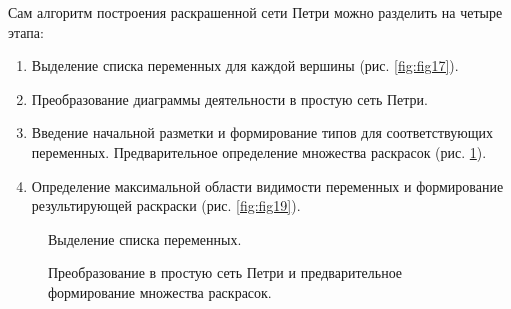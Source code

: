 Сам алгоритм построения раскрашенной сети Петри можно разделить на четыре этапа:
\begin{enumerate}
\item[1.] Выделение списка переменных для каждой вершины (рис. \ref{fig:fig17}).
\item[2.] Преобразование диаграммы деятельности в простую сеть Петри.
\item[3.] Введение начальной разметки и формирование типов для соответствующих переменных. Предварительное определение множества раскрасок (рис. \ref{fig:fig18}).
\item[4.] Определение максимальной области видимости переменных и формирование результирующей раскраски (рис. \ref{fig:fig19}).
\end{enumerate}

\begin{figure}
	\begin{minipage}[H]{0.49\linewidth}
		\caption{Выделение списка переменных.}
		\label{fig:fig17}
	\end{minipage}
	\hfill
	\begin{minipage}[H]{0.49\linewidth}
		\caption{Преобразование в простую сеть Петри и предварительное формирование множества раскрасок.}
		\label{fig:fig18}		
	\end{minipage}
\end{figure}

